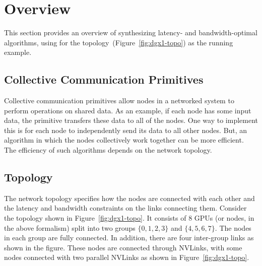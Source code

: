 \section{Overview}
This section provides an overview of synthesizing latency- and bandwidth-optimal algorithms, using \allgather for the
\dgxone topology~(Figure~\ref{fig:dgx1-topo}) as the running example.

\subsection{Collective Communication Primitives}
\label{sec:background-collectives}
Collective communication primitives allow nodes in a networked system to perform operations on shared data. As an example, if each node has some input data, the \allgather primitive transfers these data to all of the nodes.  One way to implement this is for each node to independently send its data to all other nodes. But, an algorithm in which the nodes collectively work together can be more efficient. The efficiency of such algorithms depends on the network topology.


\subsection{Topology}
The network topology specifies how the nodes are connected with each other and the latency and bandwidth constraints on the links connecting them. Consider the \dgxone topology shown in Figure~\ref{fig:dgx1-topo}. It consists of $8$ GPUs (or nodes, in the above formalism) split into two groups $\{0,1,2,3\}$ and $\{4,5,6,7\}$. The nodes in each group are fully connected. In addition, there are four inter-group links as shown in the figure. These nodes are connected through
NVLinks, with some nodes connected with two parallel NVLinks as shown in Figure~\ref{fig:dgx1-topo}.


